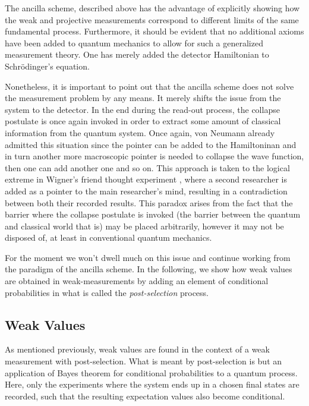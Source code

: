 \documentclass{article}
\begin{document}
The ancilla scheme, described above has the 
advantage of explicitly showing how the weak and 
projective measurements correspond to different 
limits of the same fundamental process. Furthermore,
it should be evident that no additional axioms have 
been added to quantum mechanics to allow for such 
a generalized measurement theory. One has merely added 
the detector Hamiltonian to Schrödinger's equation.

Nonetheless, it is important to point out that the 
ancilla scheme does not solve the measurement problem
by any means. It merely shifts the issue from the system to the detector.
In the end during the  read-out process, the collapse postulate is once
again invoked in order to extract some amount of classical information from the quantum system. Once
again, von Neumann already admitted this situation \cite{vonNeumannFoundationsQuantum2018} since
the pointer can be added to the Hamiltoninan and in turn another more macroscopic pointer
is needed to collapse the wave function, then one can add another one and so on. 
This approach is taken to the logical extreme in Wigner's friend 
thought experiment \cite{wignerRemarksMindBodyQuestion1995}, where a second researcher is added as a 
pointer to the main researcher's mind, resulting in 
a contradiction between both their recorded results. This paradox arises from the fact that the barrier where the collapse postulate is invoked (the barrier between the quantum and classical
world that is) may be placed arbitrarily, however it may not be 
disposed of, at least in conventional quantum mechanics. 

For the moment we won't dwell much on this issue and continue working from the paradigm
of the ancilla scheme. In the following, we show how weak values are obtained in weak-measurements
by adding an element of conditional probabilities in what is called the \textit{post-selection} 
process.

\subsection{Weak Values}

As mentioned previously, weak values are found in the context of a weak measurement with post-selection. What is meant by post-selection is but an application of Bayes theorem for 
conditional probabilities to a quantum process. Here, only the experiments where the system ends
up in a chosen final states are recorded, such that the resulting expectation values also become 
conditional. 
\end{document}
